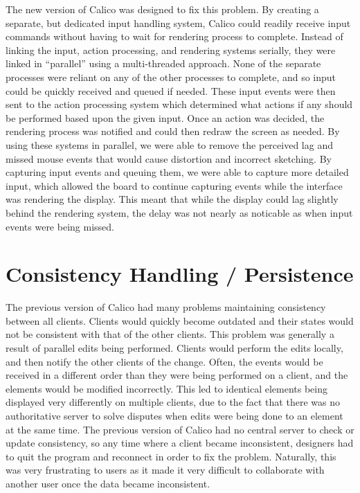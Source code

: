 The new version of Calico was designed to fix this problem. By creating a separate, but dedicated input handling system, Calico could readily receive input commands without having to wait for rendering process to complete.
Instead of linking the input, action processing, and rendering systems serially, they were linked in ``parallel'' using a multi-threaded approach. None of the separate processes were reliant on any of the other processes to complete, and so input could be quickly received and queued if needed. These input events were then sent to the action processing system which determined what actions if any should be performed based upon the given input. Once an action was decided, the rendering process was notified and could then redraw the screen as needed. By using these systems in parallel, we were able to remove the perceived lag and missed mouse events that would cause distortion and incorrect sketching. By capturing input events and queuing them, we were able to capture more detailed input, which allowed the board to continue capturing events while the interface was rendering the display. This meant that while the display could lag slightly behind the rendering system, the delay was not nearly as noticable as when input events were being missed. 


\section{Consistency Handling / Persistence}
The previous version of Calico had many problems maintaining consistency between all clients. Clients would quickly become outdated and their states would not be consistent with that of the other clients. 
This problem was generally a result of parallel edits being performed. Clients would perform the edits locally, and then notify the other clients of the change. Often, the events would be received in a different order than they were being performed on a client, and the elements would be modified incorrectly. This led to identical elements being displayed very differently on multiple clients, due to the fact that there was no authoritative server to solve disputes when edits were being done to an element at the same time.
The previous version of Calico had no central server to check or update consistency, so any time where a client became inconsistent, designers had to quit the program and reconnect in order to fix the problem.
Naturally, this was very frustrating to users as it made it very difficult to collaborate with another user once the data became inconsistent. 

